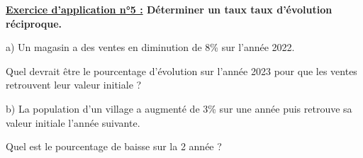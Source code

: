 \documentclass[12pt]{article}
\begin{document}
\begin{mdframed}[
    linewidth=1pt,
    linecolor=RoyalBlue,
    innertopmargin=10pt,
    innerbottommargin=10pt
]
{\color{RoyalBlue}\textbf{\underline{Exercice d'application n°5 :} 
Déterminer un taux taux d'évolution réciproque.}}
\vspace{10pt}

\hspace{1cm} a) Un magasin a des ventes en diminution de 8\% sur l'année 2022.

\hspace{1.5cm} Quel devrait être le pourcentage d'évolution sur l'année 2023 pour que les ventes retrouvent
leur valeur initiale ?

\vspace{5pt}
\hspace{1cm} b) La population d’un village a augmenté de 3\% sur une année puis retrouve sa valeur initiale
l’année suivante.

\hspace{1.5cm} Quel est le pourcentage de baisse sur la 2 année ?

\vspace{0.5cm}
{\color{black!27}\dotfill}

\vspace{0.5cm}
{\color{black!27}\dotfill}

\vspace{0.5cm}
{\color{black!27}\dotfill}

\vspace{0.5cm}
{\color{black!27}\dotfill}

\vspace{0.5cm}
{\color{black!27}\dotfill}

\vspace{0.5cm}
{\color{black!27}\dotfill}

\vspace{0.5cm}
{\color{black!27}\dotfill}

\vspace{0.5cm}
{\color{black!27}\dotfill}

\vspace{0.5cm}
{\color{black!27}\dotfill}

\vspace{0.5cm}
{\color{black!27}\dotfill}

\vspace{0.5cm}
{\color{black!27}\dotfill}

\vspace{0.5cm}
{\color{black!27}\dotfill}

\vspace{0.5cm}
{\color{black!27}\dotfill}

\vspace{20pt}

\end{mdframed}






\vspace{20pt}
\end{document}
